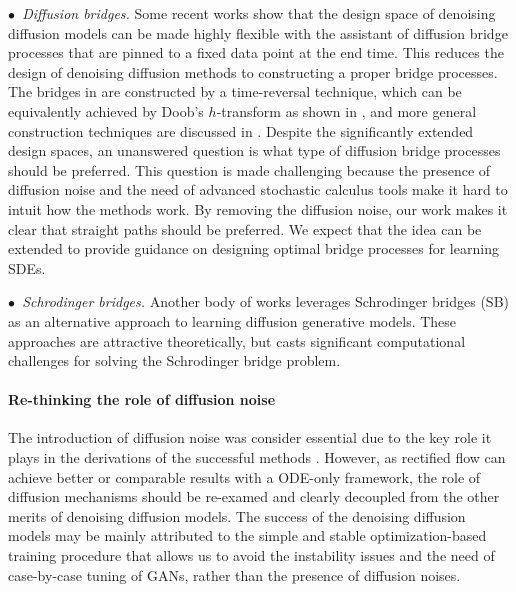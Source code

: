 \emph{$\bullet$~Diffusion bridges.}
Some recent works \cite{peluchetti2021non, bridge} show that the design space of denoising  diffusion models can be made highly  flexible with the assistant of diffusion bridge processes that are pinned to a fixed data point at the end time. This reduces the design of denoising diffusion methods to 
constructing a proper bridge processes. 
The bridges in 
\citet{song2020score} are  
constructed by a time-reversal technique, which can be equivalently achieved by Doob's $h$-transform as shown in \cite{peluchetti2021non, bridge}, 
and more general construction techniques are discussed in \cite{bridge, geobridge}.  
Despite the significantly extended  design spaces, an unanswered question %
is 
what type of diffusion bridge processes should be preferred. 
This question is made challenging because the presence of diffusion noise and the need of advanced stochastic calculus tools  make it hard to intuit  how the methods work.
By removing the diffusion noise, 
our work makes it clear that straight paths should be preferred. We expect that the idea can be extended to provide guidance on designing optimal bridge processes for learning SDEs. 

\emph{$\bullet$~Schrodinger bridges.} 
Another body of works  \citep{wang2021deep, de2021diffusion, chen2021likelihood, vargas2021solving}  
leverages  
Schrodinger bridges (SB) as an alternative approach to learning diffusion generative models. These approaches are attractive theoretically, but casts significant  
computational challenges for solving the Schrodinger bridge problem.    








\paragraph{Re-thinking the role of diffusion noise}
The introduction of diffusion noise 
was consider essential due to the key role  
it plays in the derivations of the successful methods \citep{song2020score, ho2020denoising}. 
However, 
as rectified flow 
can achieve better or comparable results with a ODE-only framework, 
the role of diffusion mechanisms 
should be re-examed and clearly decoupled from the other merits of denoising diffusion models. 
The success of  
the denoising diffusion models may be 
 mainly attributed to the simple and stable  optimization-based training procedure 
that allows us to avoid the instability issues 
and the need of case-by-case tuning of GANs, rather than the presence of diffusion noises. 



